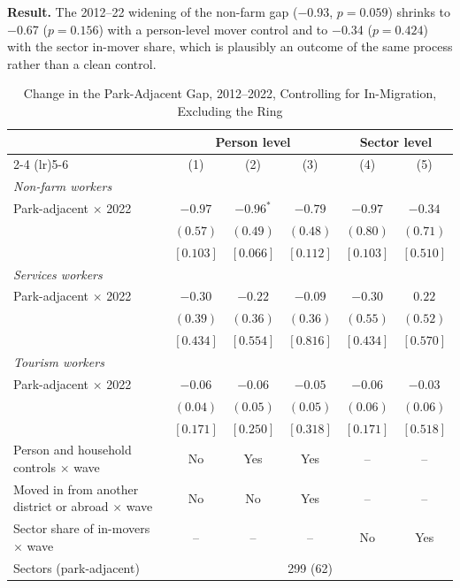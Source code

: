 \documentclass[11pt]{article}
\begin{document}
\textbf{Result.} The 2012--22 widening of the non-farm gap ($-$0.93, $p=0.059$) shrinks to $-$0.67 ($p=0.156$) with a person-level mover control and to $-$0.34 ($p=0.424$) with the sector in-mover share, which is plausibly an outcome of the same process rather than a clean control.
\clearpage
\begin{table}[H]
\centering
\caption{Change in the Park-Adjacent Gap, 2012--2022, Controlling for In-Migration, Excluding the Ring}
\label{tab:census_park_gap_migration-no-ring}
\begin{tabular}{lccccc}
\toprule
 & \multicolumn{3}{c}{Person level} & \multicolumn{2}{c}{Sector level} \\
\cmidrule(lr){2-4} \cmidrule(lr){5-6}
 & (1) & (2) & (3) & (4) & (5) \\
\midrule
\textit{Non-farm workers} & & & & & \\
Park-adjacent $\times$ 2022 & $-0.97$ & $-0.96^{*}$ & $-0.79$ & $-0.97$ & $-0.34$ \\
 & $(0.57)$ & $(0.49)$ & $(0.48)$ & $(0.80)$ & $(0.71)$ \\
 & $[0.103]$ & $[0.066]$ & $[0.112]$ & $[0.103]$ & $[0.510]$ \\
\textit{Services workers} & & & & & \\
Park-adjacent $\times$ 2022 & $-0.30$ & $-0.22$ & $-0.09$ & $-0.30$ & $0.22$ \\
 & $(0.39)$ & $(0.36)$ & $(0.36)$ & $(0.55)$ & $(0.52)$ \\
 & $[0.434]$ & $[0.554]$ & $[0.816]$ & $[0.434]$ & $[0.570]$ \\
\textit{Tourism workers} & & & & & \\
Park-adjacent $\times$ 2022 & $-0.06$ & $-0.06$ & $-0.05$ & $-0.06$ & $-0.03$ \\
 & $(0.04)$ & $(0.05)$ & $(0.05)$ & $(0.06)$ & $(0.06)$ \\
 & $[0.171]$ & $[0.250]$ & $[0.318]$ & $[0.171]$ & $[0.518]$ \\
\midrule
Person and household controls $\times$ wave & No & Yes & Yes & -- & -- \\
Moved in from another district or abroad $\times$ wave & No & No & Yes & -- & -- \\
Sector share of in-movers $\times$ wave & -- & -- & -- & No & Yes \\
Sectors (park-adjacent) & \multicolumn{5}{c}{299 (62)} \\
\bottomrule
\end{tabular}
\begin{minipage}{0.95\textwidth}\footnotesize

\end{minipage}
\end{table}
\end{document}
